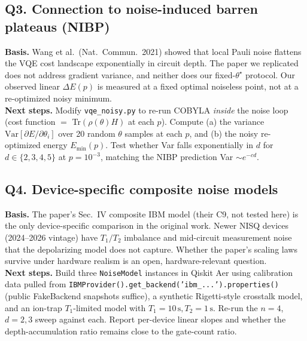 \subsection*{Q3. Connection to noise-induced barren plateaus (NIBP)}
\textbf{Basis.} Wang et al.\ (Nat.\ Commun.\ 2021) showed that local Pauli noise flattens the VQE
cost landscape exponentially in circuit depth. The paper we replicated does not address gradient
variance, and neither does our fixed-$\theta^\star$ protocol. Our observed linear $\Delta E(p)$ is
measured at a fixed optimal noiseless point, not at a re-optimized noisy minimum.
\\
\textbf{Next steps.} Modify \texttt{vqe\_noisy.py} to re-run COBYLA \emph{inside} the noise loop
(cost function $=$ Tr$(\rho(\theta) H)$ at each $p$). Compute (a) the variance
$\text{Var}[\partial E/\partial \theta_i]$ over 20 random $\theta$ samples at each $p$, and (b) the
noisy re-optimized energy $E_{\min}(p)$. Test whether Var falls exponentially in $d$ for
$d \in \{2,3,4,5\}$ at $p{=}10^{-3}$, matching the NIBP prediction Var $\sim e^{-c d}$.

\subsection*{Q4. Device-specific composite noise models}
\textbf{Basis.} The paper's Sec.~IV composite IBM model (their C9, not tested here) is the only
device-specific comparison in the original work. Newer NISQ devices (2024--2026 vintage) have $T_1/T_2$
imbalance and mid-circuit measurement noise that the depolarizing model does not capture. Whether the
paper's scaling laws survive under hardware realism is an open, hardware-relevant question.
\\
\textbf{Next steps.} Build three \texttt{NoiseModel} instances in Qiskit Aer using calibration data
pulled from \texttt{IBMProvider().get\_backend('ibm\_...').properties()} (public FakeBackend snapshots
suffice), a synthetic Rigetti-style crosstalk model, and an ion-trap $T_1$-limited model with
$T_1{=}10\,\text{s}, T_2{=}1\,\text{s}$. Re-run the $n{=}4$, $d{=}2,3$ sweep against each. Report
per-device linear slopes and whether the depth-accumulation ratio remains close to the gate-count
ratio.

